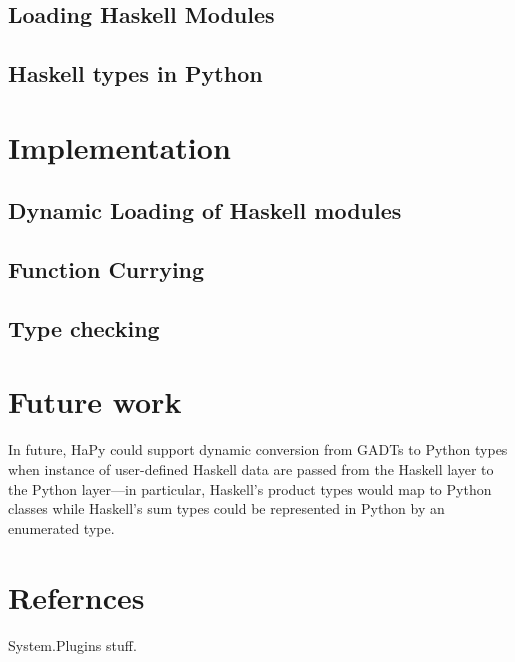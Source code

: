 \documentclass[11pt, letterpaper, oneside, twocolumn] {article}
\begin{document}
\subsection{Loading Haskell Modules}

\subsection{Haskell types in Python}

\section{Implementation}

\subsection{Dynamic Loading of Haskell modules}

\subsection{Function Currying}

\subsection{Type checking}

\section{Future work}
In future, HaPy could support dynamic conversion from GADTs to Python types when instance of user-defined Haskell data are passed from the Haskell layer to the Python layer---in particular, Haskell's product types would map to Python classes while Haskell's sum types could be represented in Python by an enumerated type. 

\section{Refernces}
System.Plugins stuff.
\end{document}

